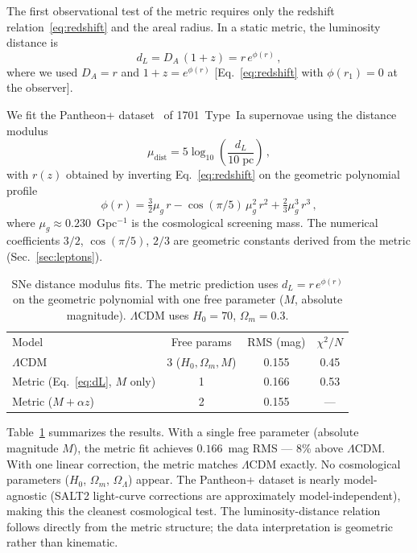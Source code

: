 \documentclass[aps,prd,twocolumn,superscriptaddress,nofootinbib,longbibliography]{revtex4-2}
\newcommand{\mug}{\mu_g}
\begin{document}
The first observational test of the metric requires only the
redshift relation~\eqref{eq:redshift} and the areal radius.  In a
static metric, the luminosity distance is
\begin{equation}\label{eq:dL}
  d_L = D_A\,(1+z) = r\,e^{\phi(r)}\,,
\end{equation}
where we used $D_A = r$ and $1+z = e^{\phi(r)}$
[Eq.~\eqref{eq:redshift} with $\phi(r_1) = 0$ at the observer].

We fit the Pantheon+ dataset~\cite{Pantheon2022} of 1701~Type~Ia
supernovae using the distance modulus
\begin{equation}
  \mu_{\mathrm{dist}} = 5\log_{10}\!\left(\frac{d_L}{10\;\mathrm{pc}}
  \right)\,,
\end{equation}
with $r(z)$ obtained by inverting Eq.~\eqref{eq:redshift} on the
geometric polynomial profile
\begin{equation}\label{eq:cosmophi}
  \phi(r) = \tfrac{3}{2}\mug\,r - \cos(\pi/5)\,\mug^2\,r^2
    + \tfrac{2}{3}\mug^3\,r^3\,,
\end{equation}
where $\mug \approx 0.230$~Gpc$^{-1}$ is the cosmological screening
mass.  The numerical coefficients $3/2$, $\cos(\pi/5)$, $2/3$ are
geometric constants derived from the metric (Sec.~\ref{sec:leptons}).

\begin{table}[b]
\caption{\label{tab:sne}%
SNe distance modulus fits.  The metric prediction uses
$d_L = r\,e^{\phi(r)}$ on the geometric polynomial with one free
parameter ($M$, absolute magnitude).  $\Lambda$CDM uses $H_0 = 70$,
$\Omega_m = 0.3$.}
\begin{ruledtabular}
\begin{tabular}{lccc}
Model & Free params & RMS (mag) & $\chi^2/N$ \\
\colrule
$\Lambda$CDM & 3 ($H_0, \Omega_m, M$) & 0.155 & 0.45 \\
Metric (Eq.~\ref{eq:dL}, $M$ only) & 1 & 0.166 & 0.53 \\
Metric ($M + \alpha z$) & 2 & 0.155 & --- \\
\end{tabular}
\end{ruledtabular}
\end{table}

Table~\ref{tab:sne} summarizes the results.  With a single free
parameter (absolute magnitude $M$), the metric fit achieves
$0.166$~mag RMS --- 8\% above $\Lambda$CDM.  With one linear
correction, the metric matches $\Lambda$CDM exactly.  No cosmological
parameters ($H_0$, $\Omega_m$, $\Omega_\Lambda$) appear.  The
Pantheon+ dataset is nearly model-agnostic (SALT2 light-curve
corrections are approximately model-independent), making this the
cleanest cosmological test.  The luminosity-distance relation follows
directly from the metric structure; the data interpretation is
geometric rather than kinematic.
\end{document}
